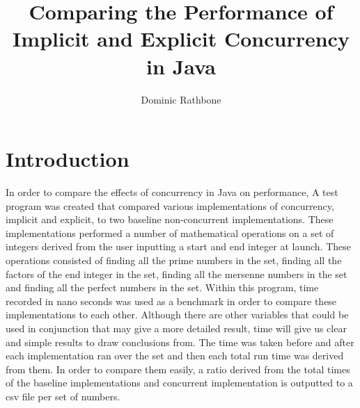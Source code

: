 \documentclass[]{report}
\title{Comparing the Performance of Implicit and Explicit Concurrency in Java}
\author{Dominic Rathbone}
\begin{document}
\maketitle

\chapter{Introduction}
In order to compare the effects of concurrency in Java on performance, A test program was created that compared various implementations of concurrency, implicit and explicit, to two baseline non-concurrent implementations. These implementations performed a number of mathematical operations on a set of integers derived from the user inputting a start and end integer at launch. These operations consisted of finding all the prime numbers in the set, finding all the factors of the end integer in the set, finding all the mersenne numbers in the set and finding all the perfect numbers in the set. Within this program, time recorded in nano seconds was used as a benchmark in order to compare these implementations to each other. Although there are other variables that could be used in conjunction that may give a more detailed result, time will give us clear and simple results to draw conclusions from. The time was taken before and after each implementation ran over the set and then each total run time was derived from them. In order to compare them easily, a ratio derived from the total times of the baseline implementations and concurrent implementation is outputted to a csv file per set of numbers. 
\end{document}
